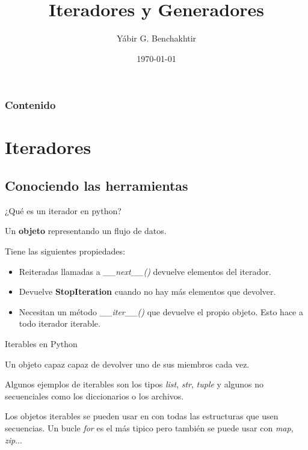 \documentclass[spanish]{beamer}
\title{Iteradores y Generadores}
\date{\today}
\author{Yábir G. Benchakhtir}
\institute{LibreIM}
\begin{document}
  \maketitle

  \begin{frame}\frametitle{Contenido}
    \tableofcontents
  \end{frame} 
  \section{Iteradores}
  \subsection{Conociendo las herramientas}
  \begin{frame}{¿Qué es un iterador en python?}
    \begin{definition}
      Un \textbf{objeto} representando un flujo de datos.
    \end{definition}

    Tiene las siguientes propiedades:

    \begin{itemize}
    \item Reiteradas llamadas a \textit{\_\_next\_\_()} devuelve elementos del iterador.
    \item Devuelve \textbf{StopIteration} cuando no hay más elementos que devolver.
    \item Necesitan un método \textit{\_\_iter\_\_()} que devuelve el
      propio objeto. Esto hace a todo iterador iterable.
    \end{itemize}
  \end{frame}

  \begin{frame}{Iterables en Python}
    \begin{definition}
      Un objeto capaz capaz de devolver uno de sus miembros cada vez.
    \end{definition}

    Algunos ejemplos de iterables son los tipos \textit{list},
    \textit{str}, \textit{tuple} y algunos no secuenciales como los
    diccionarios o los archivos.
  \end{frame}

  \begin{frame}
    Los objetos iterables se pueden usar en con todas las estructuras
    que usen secuencias. Un bucle \textit{for} es el más tipico pero
    también se puede usar con \textit{map}, \textit{zip}...
  \end{frame}
\end{document}
